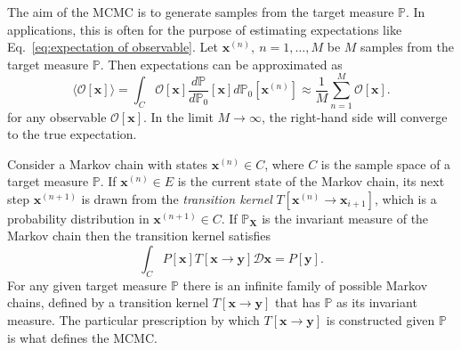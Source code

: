 The aim of the MCMC is to generate samples from the target measure $\mathbb{P}$. In applications, this is often for the purpose of estimating expectations like Eq.~\ref{eq:expectation of observable}. Let $\mathbf{x}^{(n)},\ n=1,\dots,M$ be $M$ samples from the target measure $\mathbb{P}$. Then expectations can be approximated as
\begin{equation}
	\langle \mathcal{O}[\mathbf{x}] \rangle = \int_C \mathcal{O}[\mathbf{x}] \frac{d \mathbb{P}}{d \mathbb{P}_0}[\mathbf{x}] d \mathbb{P}_0[\mathbf{x}^{(n)}] \approx \frac{1}{M} \sum_{n=1}^{M} \mathcal{O}[\mathbf{x}].
\end{equation}
for any observable $\mathcal{O}[\mathbf{x}]$. In the limit $M \to \infty$, the right-hand side will converge to the true expectation.

Consider a Markov chain with states $\mathbf{x}^{(n)} \in C$, where $C$ is the sample space of a target measure $\mathbb{P}$. If $\mathbf{x}^{(n)} \in E$ is the current state of the Markov chain, its next step $\mathbf{x}^{(n+1)}$ is drawn from the \textit{transition kernel} $T[\mathbf{x}^{(n)} \to \mathbf{x}_{i+1}]$, which is a probability distribution in $\mathbf{x}^{(n+1)} \in C$. If $\mathbb{P}_\mathbf{X}$ is the invariant measure of the Markov chain then the transition kernel satisfies
\begin{equation} \label{eq:P_X invariant measure T}
	\int_C P[\mathbf{x}] T[\mathbf{x} \to \mathbf{y}] \mathcal{D} \mathbf{x} = P[\mathbf{y}].
\end{equation}
For any given target measure $\mathbb{P}$ there is an infinite family of possible Markov chains, defined by a transition kernel $T[\mathbf{x} \to \mathbf{y}]$ that has $\mathbb{P}$ as its invariant measure. The particular prescription by which $T[\mathbf{x} \to \mathbf{y}]$ is constructed given $\mathbb{P}$ is what defines the MCMC.


